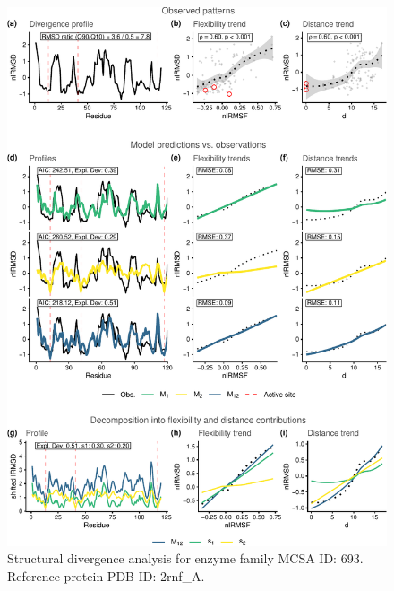 \documentclass[
]{article}
\begin{document}
\clearpage
\begin{figure}[H]
\centering


\begin{center}\includegraphics{supplementary_material_files/figure-latex/generate_figures-27} \end{center}

\caption{Structural divergence analysis for enzyme family MCSA ID: 693. Reference protein PDB ID: 2rnf\_A.}
\end{figure}
\end{document}
